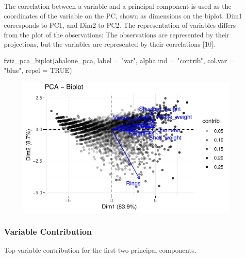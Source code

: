 \documentclass[
  letterpaper,
  DIV=11,
  numbers=noendperiod]{scrreprt}
\newenvironment{Shaded}{\begin{snugshade}}{\end{snugshade}}
\newcommand{\AttributeTok}[1]{\textcolor[rgb]{0.40,0.45,0.13}{#1}}
\newcommand{\ConstantTok}[1]{\textcolor[rgb]{0.56,0.35,0.01}{#1}}
\newcommand{\FunctionTok}[1]{\textcolor[rgb]{0.28,0.35,0.67}{#1}}
\newcommand{\NormalTok}[1]{\textcolor[rgb]{0.00,0.23,0.31}{#1}}
\newcommand{\StringTok}[1]{\textcolor[rgb]{0.13,0.47,0.30}{#1}}
\begin{document}
The correlation between a variable and a principal component is used as
the coordinates of the variable on the PC, shown as dimensions on the
biplot. Dim1 corresponds to PC1, and Dim2 to PC2. The representation of
variables differs from the plot of the observations: The observations
are represented by their projections, but the variables are represented
by their correlations {[}10{]}.

\begin{Shaded}
\begin{Highlighting}[]
\FunctionTok{fviz\_pca\_biplot}\NormalTok{(abalone\_pca, }\AttributeTok{label =} \StringTok{"var"}\NormalTok{, }\AttributeTok{alpha.ind =} \StringTok{"contrib"}\NormalTok{, }\AttributeTok{col.var =} \StringTok{"blue"}\NormalTok{, }\AttributeTok{repel =} \ConstantTok{TRUE}\NormalTok{)}
\end{Highlighting}
\end{Shaded}

\begin{figure}[H]

{\centering \includegraphics{examples_files/figure-pdf/unnamed-chunk-12-1.pdf}

}

\end{figure}

\hypertarget{variable-contribution}{%
\subsubsection{Variable Contribution}\label{variable-contribution}}

Top variable contribution for the first two principal components.
\end{document}
